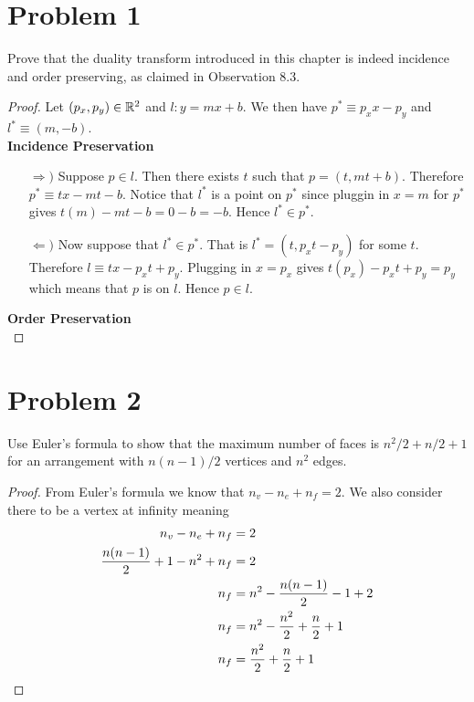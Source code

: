 \documentclass[12pt]{extarticle}
\begin{document}
\section*{Problem 1}
Prove that the duality transform introduced in this chapter is indeed incidence and order preserving, as claimed in Observation 8.3.

\begin{proof}
    Let $(p_x,p_y) \in \mathbb{R}^2$ and $l : y = mx + b$. We then have $p^* \equiv p_x x - p_y$ and $l^* \equiv (m, -b)$.
    \\

    \noindent
    \textbf{Incidence Preservation}
    \begin{enumerate}
        \item[$\Rightarrow)$] Suppose $p \in l$. Then there exists $t$ such that $p = (t, mt + b)$. Therefore $p^* \equiv tx - mt - b$. Notice that $l^*$ is a point on $p^*$ since pluggin in $x=m$ for $p^*$ gives $t(m) - mt - b = 0 - b = -b$. Hence $l^* \in p^*$.
        \item[$\Leftarrow)$] Now suppose that $l^* \in p^*$. That is $l^* = (t, p_x t - p_y)$ for some $t$. Therefore $l \equiv tx - p_x t + p_y$. Plugging in $x = p_x$ gives $t(p_x) - p_x t + p_y = p_y$ which means that $p$ is on $l$. Hence $p \in l$.
    \end{enumerate}

    \textbf{Order Preservation}
    \\

\end{proof}

\section*{Problem 2}
Use Euler's formula to show that the maximum number of faces is $n^2 /2 + n/2 + 1$ for an arrangement with $n(n - 1)/2$ vertices and $n^2$ edges.

\begin{proof}
    From Euler's formula we know that $n_v - n_e + n_f = 2$. We also consider there to be a vertex at infinity meaning
    \begin{align*}
        n_v - n_e + n_f &= 2 \\
        \frac{n(n-1)}{2} + 1 - n^2 + n_f &= 2 \\
        n_f &= n^2 - \frac{n(n-1)}{2} - 1 + 2 \\
        n_f &= n^2 - \frac{n^2}{2} + \frac{n}{2} + 1 \\
        n_f &= \frac{n^2}{2} + \frac{n}{2} + 1 \qedhere
    \end{align*}
\end{proof}
\end{document}
